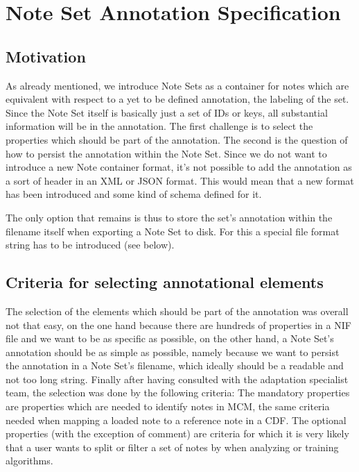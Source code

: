 \section{Note Set Annotation Specification}
\label{ns_annotation_spec}

\subsection{Motivation}
As already mentioned, we introduce Note Sets as a container for notes which are equivalent with respect to a yet to be defined annotation, the labeling of the set. Since the Note Set itself is basically just a set of IDs or keys, all substantial information will be in the annotation. The first challenge is to select the properties which should be part of the annotation. The second is the question of how to persist the annotation within the Note Set. Since we do not want to introduce a new Note container format, it's not possible to add the annotation as a sort of header in an XML or JSON format. This would mean that a new format has been introduced and some kind of schema defined for it. \par
The only option that remains is thus to store the set's annotation within the filename itself when exporting a Note Set to disk. For this a special file format string has to be introduced (see below).
\subsection{Criteria for selecting annotational elements}
The selection of the elements which should be part of the annotation was overall not that easy, on the one hand because there are hundreds of properties in a NIF file and we want to be as specific as possible, on the other hand, a Note Set's annotation should be as simple as possible, namely because we want to persist the annotation in a Note Set's filename, which ideally should be a readable and not too long string.
Finally after having consulted with the adaptation specialist team, the selection was done by the following criteria: The mandatory properties are properties which are needed to identify notes in MCM, the same criteria needed when mapping a loaded note to a reference note in a CDF. The optional properties (with the exception of comment) are criteria for which it is very likely that a user wants to split or filter a set of notes by when analyzing or training algorithms.
